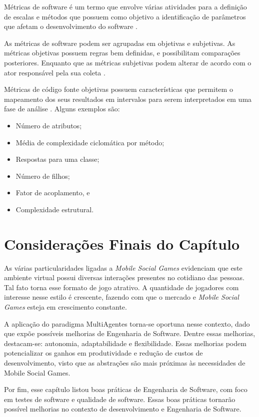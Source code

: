 Métricas de software é um termo que envolve várias atividades para a definição
de escalas e métodos que possuem como objetivo a identificação de parâmetros
que afetam o desenvolvimento do software \cite{metrics}.

As métricas de software podem ser agrupadas em objetivas e subjetivas. As
métricas objetivas possuem regras bem definidas, e possibilitam comparações
posteriores. Enquanto que as métricas subjetivas podem alterar de acordo com o
ator responsável pela sua coleta \cite{meirelles2013}.

Métricas de código fonte objetivas possuem características que permitem o
mapeamento dos seus resultados em intervalos para serem interpretados em uma
fase de análise \cite{meirelles2013}. Alguns exemplos são:

\begin{itemize}
  \item Número de atributos;
  \item Média de complexidade ciclomática por método;
  \item Respostas para uma classe;
  \item Número de filhos;
  \item Fator de acoplamento, e
  \item Complexidade estrutural.
\end{itemize}

\section{Considerações Finais do Capítulo}

As várias particularidades ligadas a \textit{Mobile Social Games} evidenciam
que este ambiente virtual possui diversas interações presentes no cotidiano das
pessoas. Tal fato torna esse formato de jogo atrativo. A quantidade de
jogadores com interesse nesse estilo é crescente, fazendo com que o mercado e
\textit{Mobile Social Games} esteja em crescimento constante.

A aplicação do paradigma MultiAgentes torna-se oportuna nesse contexto, dado que
expõe possíveis melhorias de Engenharia de Software. Dentre essas melhorias,
destacam-se: autonomia, adaptabilidade e flexibilidade. Essas melhorias podem
potencializar os ganhos em produtividade e redução de custos de
desenvolvimento, visto que as abstrações são mais próximas às necessidades de
Mobile Social Games.

Por fim, esse capítulo listou boas práticas de Engenharia de Software, com foco
em testes de software e qualidade de software. Essas boas práticas tornarão
possível melhorias no contexto de desenvolvimento e Engenharia de Software.
